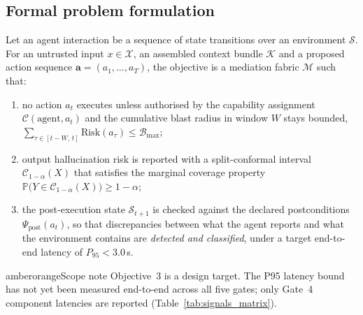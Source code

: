 \documentclass[11pt,a4paper]{article}
\begin{document}
\subsection{Formal problem formulation}
\begin{tcolorbox}[colback=lightgreybg,colframe=primarynavy,title={\sffamily\bfseries Formal problem formulation},breakable]
Let an agent interaction be a sequence of state transitions over an environment $\mathcal S$. For an untrusted input $x\in\mathcal X$, an assembled context bundle $\mathcal K$ and a proposed action sequence $\mathbf a=(a_1,\dots,a_T)$, the objective is a mediation fabric $\mathcal M$ such that:
\begin{enumerate}[leftmargin=*,itemsep=1pt]
  \item no action $a_t$ executes unless authorised by the capability assignment $\mathcal C(\text{agent},a_t)$ and the cumulative blast radius in window $W$ stays bounded, $\sum_{\tau\in[t-W,\,t]}\mathrm{Risk}(a_\tau)\le\mathcal B_{\max}$;
  \item output hallucination risk is reported with a split-conformal interval $\mathcal C_{1-\alpha}(X)$ that satisfies the marginal coverage property $\mathbb P\big(Y\in\mathcal C_{1-\alpha}(X)\big)\ge 1-\alpha$;
  \item the post-execution state $\mathcal S_{t+1}$ is checked against the declared postconditions $\Psi_{\text{post}}(a_t)$, so that discrepancies between what the agent reports and what the environment contains are \emph{detected and classified}, under a target end-to-end latency of $P_{95}<3.0$\,s.
\end{enumerate}
\end{tcolorbox}

\begin{infobox}{amberorange}{Scope note}
Objective~3 is a design target. The P95 latency bound has not yet been measured end-to-end across all five gates; only Gate~4 component latencies are reported (Table~\ref{tab:signals_matrix}).
\end{infobox}

\end{document}

